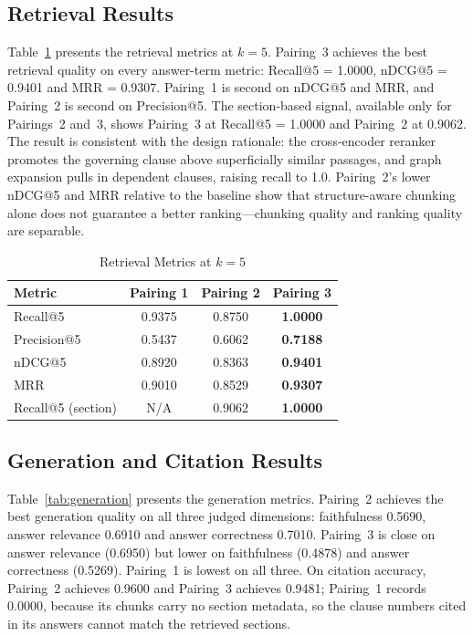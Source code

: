 \documentclass[conference]{IEEEtran}
\begin{document}
\subsection{Retrieval Results}
Table~\ref{tab:retrieval} presents the retrieval metrics at $k=5$. Pairing~3 achieves the best retrieval quality on every answer-term metric: Recall@5 = 1.0000, nDCG@5 = 0.9401 and MRR = 0.9307. Pairing~1 is second on nDCG@5 and MRR, and Pairing~2 is second on Precision@5. The section-based signal, available only for Pairings~2 and~3, shows Pairing~3 at Recall@5 = 1.0000 and Pairing~2 at 0.9062. The result is consistent with the design rationale: the cross-encoder reranker promotes the governing clause above superficially similar passages, and graph expansion pulls in dependent clauses, raising recall to 1.0. Pairing~2's lower nDCG@5 and MRR relative to the baseline show that structure-aware chunking alone does not guarantee a better ranking---chunking quality and ranking quality are separable.

\begin{table}[t]
\caption{Retrieval Metrics at $k=5$}
\label{tab:retrieval}
\centering
\begin{tabular}{lccc}
\toprule
Metric & Pairing 1 & Pairing 2 & Pairing 3 \\
\midrule
Recall@5 & 0.9375 & 0.8750 & \textbf{1.0000} \\
Precision@5 & 0.5437 & 0.6062 & \textbf{0.7188} \\
nDCG@5 & 0.8920 & 0.8363 & \textbf{0.9401} \\
MRR & 0.9010 & 0.8529 & \textbf{0.9307} \\
Recall@5 (section) & N/A & 0.9062 & \textbf{1.0000} \\
\bottomrule
\end{tabular}
\end{table}

\subsection{Generation and Citation Results}
Table~\ref{tab:generation} presents the generation metrics. Pairing~2 achieves the best generation quality on all three judged dimensions: faithfulness 0.5690, answer relevance 0.6910 and answer correctness 0.7010. Pairing~3 is close on answer relevance (0.6950) but lower on faithfulness (0.4878) and answer correctness (0.5269). Pairing~1 is lowest on all three. On citation accuracy, Pairing~2 achieves 0.9600 and Pairing~3 achieves 0.9481; Pairing~1 records 0.0000, because its chunks carry no section metadata, so the clause numbers cited in its answers cannot match the retrieved sections.
\end{document}
